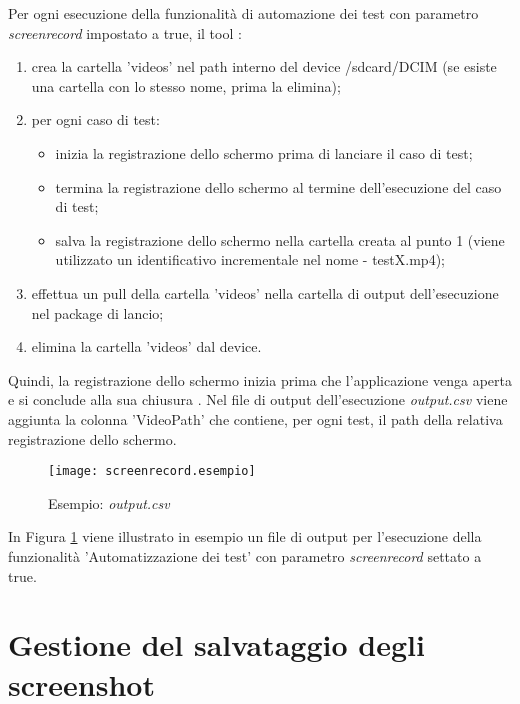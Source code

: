 \label{gsr} 
Per ogni esecuzione della funzionalità di automazione dei test con parametro \emph{screenrecord} impostato a true, il tool :
\begin{enumerate} [nosep]
\item crea la cartella 'videos' nel path interno del device  /sdcard/DCIM (se esiste una cartella con lo stesso nome, prima la elimina);
\item per ogni caso di test:
\begin{itemize} [nosep]
\item [1.]  inizia la registrazione dello schermo prima di lanciare il caso di test;
\item [2.] termina la registrazione dello schermo al termine dell'esecuzione del caso di test;
\item [3.] salva la registrazione dello schermo nella cartella creata al punto 1 (viene utilizzato un identificativo incrementale nel nome - testX.mp4);
\end{itemize}
\item effettua un pull della cartella 'videos' nella cartella di output dell'esecuzione nel package di lancio;
\item elimina la cartella 'videos' dal device.
\end{enumerate}
\bigskip
\noindent Quindi, la registrazione dello schermo inizia prima che l'applicazione venga aperta e si conclude alla sua chiusura . Nel file di output dell'esecuzione \emph{output.csv} viene aggiunta la colonna 'VideoPath' che contiene, per ogni test, il path della relativa registrazione dello schermo. 
\begin{figure}[H]
	\texttt{[image: screenrecord.esempio]}
	\centering
	\caption{Esempio: \emph{output.csv}}
    \label{fig:resempio}
\end{figure}

\noindent In Figura \ref{fig:resempio} viene illustrato in esempio un file di output per l'esecuzione della funzionalità 'Automatizzazione dei test' con parametro \emph{screenrecord} settato a true.


\section{Gestione del salvataggio degli screenshot}  

